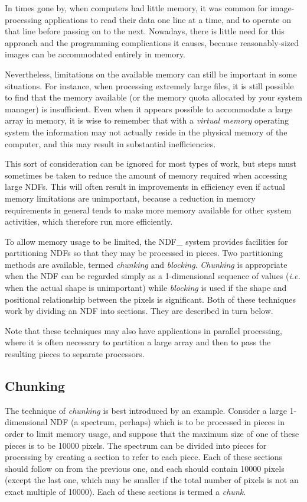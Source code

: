 \documentclass[twoside,11pt,nolof]{starlink}
\providecommand{\st}[1]{{\emph{#1}}}
\begin{document}
In times gone by, when computers had little memory, it was common for
image-processing applications to read their data one line at a time, and
to operate on that line before passing on to the next. Nowadays, there
is little need for this approach and the programming complications it
causes, because reasonably-sized images can be accommodated entirely in
memory.

Nevertheless, limitations on the available memory can still be important in some
situations. For instance, when processing extremely large files, it is still
possible to find that the memory available (or the memory quota allocated by
your system manager) is insufficient. Even when it appears possible to
accommodate a large array in memory, it is wise to remember that with
a \st{virtual memory\/} operating system the information may not
actually reside in
the physical memory of the computer, and this may result in substantial
inefficiencies.

This sort of consideration can be ignored for most types of work, but
steps must sometimes be taken to reduce the amount of memory required
when accessing large NDFs. This will often result in improvements in
efficiency even if actual memory limitations are unimportant, because a
reduction in memory requirements in general tends to make more memory
available for other system activities, which therefore run more
efficiently.

To allow memory usage to be limited, the NDF\_ system provides
facilities for partitioning NDFs so that they may be processed in
pieces. Two partitioning methods are available, termed \st{chunking\/}
and \st{blocking}. \st{Chunking\/} is appropriate when the NDF can be
regarded simply as a 1-dimensional sequence of values (\st{i.e.\/} when
the actual shape is unimportant) while \st{blocking\/} is used if the
shape and positional relationship between the pixels is significant.
Both of these techniques work by dividing an NDF into sections. They
are described in turn below.

Note that these techniques may also have applications in parallel
processing, where it is often necessary to partition a large array and
then to pass the resulting pieces to separate processors.

\subsection{Chunking}

The technique of \st{chunking\/} is best introduced by an example.
Consider a large \mbox{1-dimensional} NDF (a spectrum, perhaps) which is
to be processed in pieces in order to limit memory usage, and suppose
that the maximum size of one of these pieces is to be 10000 pixels. The
spectrum can be divided into pieces for processing by creating a section
to refer to each piece. Each of these sections should follow on from the
previous one, and each should contain 10000 pixels (except the last one,
which may be smaller if the total number of pixels is not an exact
multiple of 10000). Each of these sections is termed a \st{chunk}.
\end{document}
